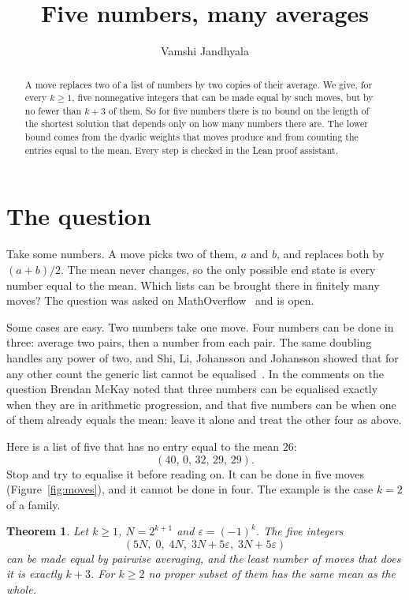 \documentclass[11pt]{article}
\title{Five numbers, many averages}
\author{Vamshi Jandhyala}
\date{}
\newtheorem{theorem}{Theorem}
\theoremstyle{remark}
\begin{document}
\maketitle
\vspace{-2em}

\begin{abstract}
A move replaces two of a list of numbers by two copies of their average. We give, for every $k\ge1$, five
nonnegative integers that can be made equal by such moves, but by no fewer than $k+3$ of them. So for five
numbers there is no bound on the length of the shortest solution that depends only on how many numbers
there are. The lower bound comes from the dyadic weights that moves produce and from counting the entries
equal to the mean. Every step is checked in the Lean proof assistant.
\end{abstract}

\section{The question}

Take some numbers. A move picks two of them, $a$ and $b$, and replaces both by $(a+b)/2$. The mean never
changes, so the only possible end state is every number equal to the mean. Which lists can be brought there
in finitely many moves? The question was asked on MathOverflow~\cite{MO} and is open.

Some cases are easy. Two numbers take one move. Four numbers can be done in three: average two pairs, then a number
from each pair. The same doubling handles any power of two, and Shi, Li, Johansson and Johansson showed that
for any other count the generic list cannot be equalised~\cite{SLJJ16}. In the comments on the question Brendan
McKay noted that three numbers can be equalised exactly when they are in arithmetic progression, and that five
numbers can be when one of them already equals the mean: leave it alone and treat the other four as above.

Here is a list of five that has no entry equal to the mean $26$:
\[
(40,\,0,\,32,\,29,\,29).
\]
Stop and try to equalise it before reading on. It can be done in five moves (Figure~\ref{fig:moves}), and
it cannot be done in four. The example is the case $k=2$ of a family.

\begin{theorem}\label{thm:main}
Let $k\ge1$, $N=2^{k+1}$ and $\varepsilon=(-1)^k$. The five integers
\[
(5N,\;0,\;4N,\;3N+5\varepsilon,\;3N+5\varepsilon)
\]
can be made equal by pairwise averaging, and the least number of moves that does it is exactly $k+3$.
For $k\ge2$ no proper subset of them has the same mean as the whole.
\end{theorem}
\end{document}
